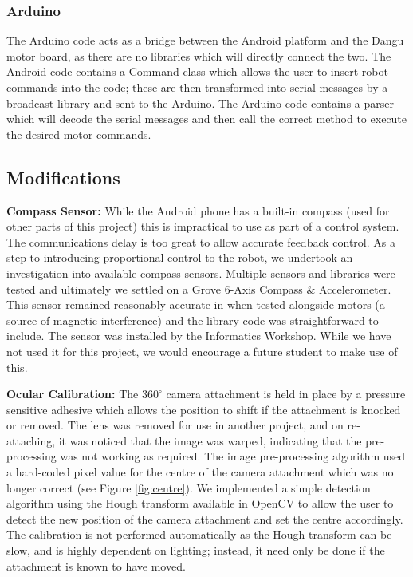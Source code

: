 \documentclass[a4paper,11pt,twoside,openright]{article}
\begin{document}
\subsubsection{ Arduino }
The Arduino code acts as a bridge between the Android platform and the Dangu
motor board, as there are no libraries which will directly connect the two.
The Android code contains a Command class which allows the user to insert robot
commands into the code; these are then transformed into serial messages by a
broadcast library \cite{Eberding2016} and sent to the Arduino. The Arduino code
contains a parser which will decode the serial messages and then call the
correct method to execute the desired motor commands.

\subsection{ Modifications }
\textbf{Compass Sensor:}
While the Android phone has a built-in compass (used for other parts of this
project) this is impractical to use as part of a control system. The
communications delay is too great to allow accurate feedback control.
As a step to introducing proportional control to the robot, we undertook an
investigation into available compass sensors. Multiple sensors and libraries
were tested and ultimately we settled on a Grove 6-Axis Compass \& Accelerometer.
This sensor remained reasonably accurate in when tested alongside motors (a
source of magnetic interference) and the library code was straightforward to
include. The sensor was installed by the Informatics Workshop. While we have not
used it for this project, we would encourage a future student to make use of
this.
\newline
\par

\textbf{Ocular Calibration:}
The $360^{\circ}$ camera attachment is held in place by a pressure sensitive
adhesive which allows the position to shift if the attachment is knocked or
removed. The lens was removed for use in another project, and on re-attaching, it
was noticed that the image was warped, indicating that the pre-processing was not
working as required. The image pre-processing algorithm used a hard-coded pixel
value for the centre of the camera attachment which was no longer correct
(see Figure \ref{fig:centre}). We implemented a simple detection
algorithm using the Hough transform available in OpenCV to allow the user
to detect the new position of the camera attachment and set the centre
accordingly. The calibration is not performed automatically as the Hough
transform can be slow, and is highly dependent on lighting; instead, it
need only be done if the attachment is known to have moved.
\newline
\par
\end{document}
